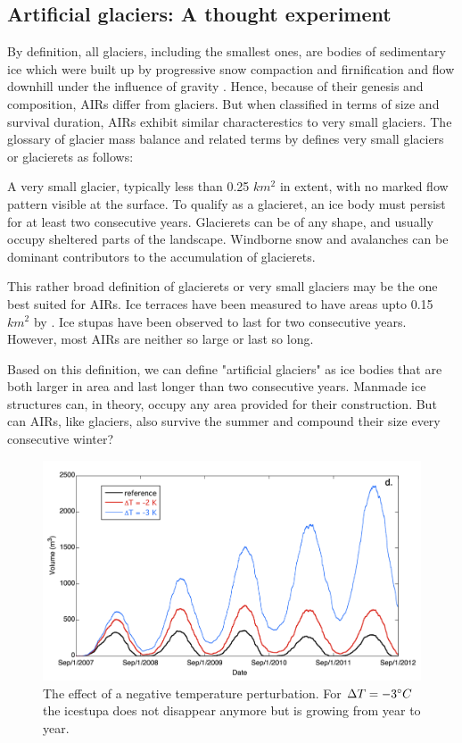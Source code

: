 \subsection{Artificial glaciers: A thought experiment}

By definition, all glaciers, including the smallest ones, are bodies of sedimentary ice which were built up by
progressive snow compaction and firnification and flow downhill under the influence of gravity
\cite{benndouglasiGlaciersGlaciation2014}. Hence, because of their genesis and composition, AIRs differ from
glaciers. But when classified in terms of size and survival duration, AIRs exhibit similar characterestics to
very small glaciers. The glossary of glacier mass balance and related terms by
\citet{cogleyGlossaryGlacierMass2010} defines very small glaciers or glacierets as follows:

\begin{thesis_quotation}
  A very small glacier, typically less than 0.25 $km^2$ in extent, with no marked flow pattern
  visible at the surface. To qualify as a glacieret, an ice body must persist for at least two consecutive
  years. Glacierets can be of any shape, and usually occupy sheltered parts of the landscape. Windborne snow and
  avalanches can be dominant contributors to the accumulation of glacierets. 
\end{thesis_quotation}

This rather broad definition of glacierets or very small glaciers may be the one best suited for AIRs. Ice
terraces have been measured to have areas upto 0.15 $km^2$ by
\citet{nusserSociohydrologyArtificialGlaciers2019}. Ice stupas have been observed to last for two consecutive
years. However, most AIRs are neither so large or last so long.

Based on this definition, we can define "artificial glaciers" as ice bodies that are both larger in area and
last longer than two consecutive years. Manmade ice structures can, in theory, occupy any area provided for
their construction. But can AIRs, like glaciers, also survive the summer and compound their size every
consecutive winter? 

\begin{figure}[htb]
  \centering
	\includegraphics[width=12 cm]{figs/PIR_example.png}
  \caption{The effect of a negative temperature perturbation. For $\Delta T = -3 ^{\circ} C$ the icestupa does
  not disappear anymore but is growing from year to year.}
\label{fig:PIR}
\end{figure}

